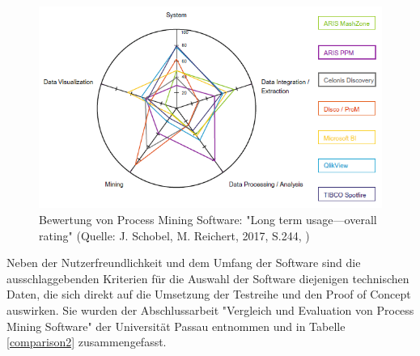 \begin{figure}[!ht]
    \centering
    \includegraphics[scale=0.62]{figures/Appbildungen/toolEval.PNG}
    \caption{Bewertung von Process Mining Software: "Long term usage—overall rating" (Quelle: J. Schobel, M. Reichert, 2017, S.244, \cite{Schobel2017})}
    \label{fig:toolEval}
\end{figure}

Neben der Nutzerfreundlichkeit und dem Umfang der Software sind die ausschlaggebenden Kriterien für die Auswahl der Software diejenigen technischen Daten, die sich direkt auf die Umsetzung der Testreihe und den Proof of Concept auswirken. Sie wurden der Abschlussarbeit "Vergleich und Evaluation von Process Mining Software" der Universität Passau entnommen \cite{compPM} und in Tabelle \ref{comparison2} zusammengefasst.

\begin{table}[!h]
\centering
{}
\caption{Gegenüberstellung von technischen Eigenschaften der populärsten Process Mining Lösungen}
\label{comparison2}
\end{table}

